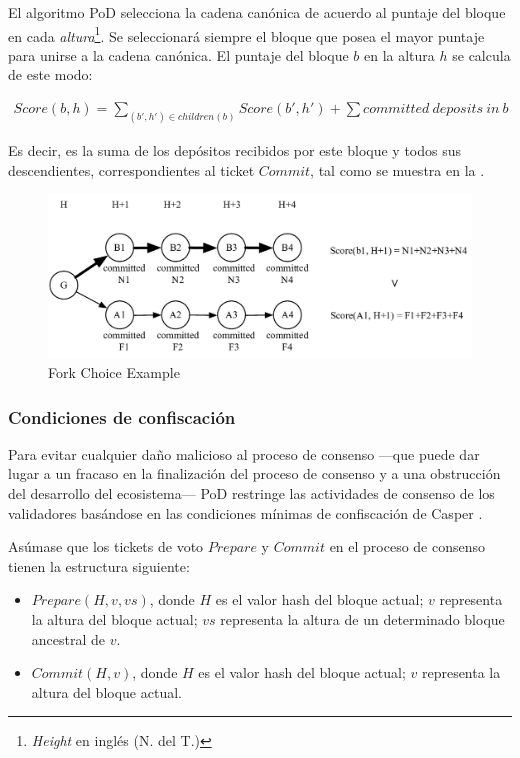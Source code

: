 El algoritmo PoD selecciona la cadena canónica de acuerdo al puntaje del bloque en cada \textit{altura}\footnote{\textit{Height} en inglés (N. del T.)}. Se seleccionará siempre el bloque que posea el mayor puntaje para unirse a la cadena canónica. El puntaje del bloque $b$ en la altura $h$ se calcula de este modo:

\begin{align}
Score(b, h) = \sum_{(b',h') \in children(b)}Score(b', h') + \sum committed~deposits~in~b
\end{align}
\noindent

Es decir, es la suma de los depósitos recibidos por este bloque y todos sus descendientes, correspondientes al ticket $Commit$, tal como se muestra en la .

\begin{figure}[h]
\centering
\includegraphics[width=12cm]{./figs/fork}
\caption{Fork Choice Example}
\label{fig:fork_choice}
\end{figure}

\subsubsection{Condiciones de confiscación}
\label{pod:design:vote}

Para evitar cualquier daño malicioso al proceso de consenso —que puede dar lugar a un fracaso en la finalización del proceso de consenso y a una obstrucción del desarrollo del ecosistema— PoD restringe las actividades de consenso de los validadores basándose en las condiciones mínimas de confiscación de Casper \cite{minimal_slash_rules}.

Asúmase que los tickets de voto $Prepare$ y $Commit$ en el proceso de consenso tienen la estructura siguiente:

\begin{itemize}
\item $Prepare(H, v, vs)$, donde $H$ es el valor hash del bloque actual; $v$ representa la altura del bloque actual; $vs$ representa la altura de un determinado bloque ancestral de $v$.

\item $Commit(H, v)$, donde $H$ es el valor hash del bloque actual; $v$ representa la altura del bloque actual.
\end{itemize}

